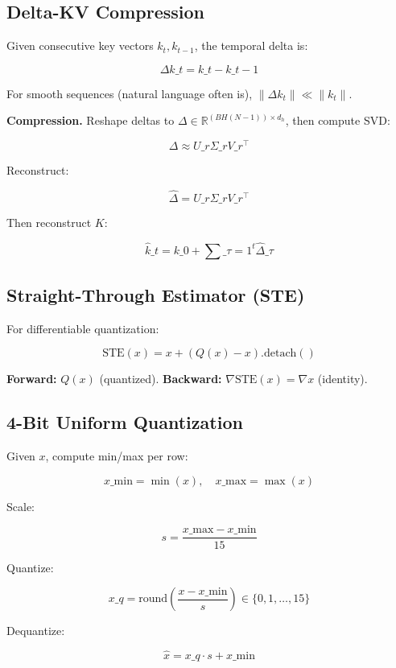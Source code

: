 \subsection{Delta-KV Compression}

Given consecutive key vectors $k_t, k_{t-1}$, the temporal delta is:

\[
\Delta k\_t = k\_t - k\_{t-1}
\tag{3.7}
\]

For smooth sequences (natural language often is), $\|\Delta k_t\| \ll \|k_t\|$.

\textbf{Compression.} Reshape deltas to $\Delta \in \mathbb{R}^{(B H (N-1)) \times d_h}$, 
then compute SVD:

\[
\Delta \approx U\_r \Sigma\_r V\_r^\top
\tag{3.8}
\]

Reconstruct:

\[
\hat{\Delta} = U\_r \Sigma\_r V\_r^\top
\tag{3.9}
\]

Then reconstruct $K$:

\[
\hat{k}\_t = k\_0 + \sum\_{\tau=1}^t \hat{\Delta}\_\tau
\tag{3.10}
\]

\subsection{Straight-Through Estimator (STE)}

For differentiable quantization:

\[
\text{STE}(x) = x + (Q(x) - x).\text{detach}()
\tag{3.11}
\]

\textbf{Forward:} $Q(x)$ (quantized).
\textbf{Backward:} $\nabla \text{STE}(x) = \nabla x$ (identity).

\subsection{4-Bit Uniform Quantization}

Given $x$, compute min/max per row:

\[
x\_\text{min} = \min(x), \quad x\_\text{max} = \max(x)
\tag{3.12}
\]

Scale:

\[
s = \frac{x\_\text{max} - x\_\text{min}}{15}
\tag{3.13}
\]

Quantize:

\[
x\_q = \text{round}\!\left(\frac{x - x\_\text{min}}{s}\right) \in \{0, 1, \dots, 15\}
\tag{3.14}
\]

Dequantize:

\[
\hat{x} = x\_q \cdot s + x\_\text{min}
\tag{3.15}
\]

